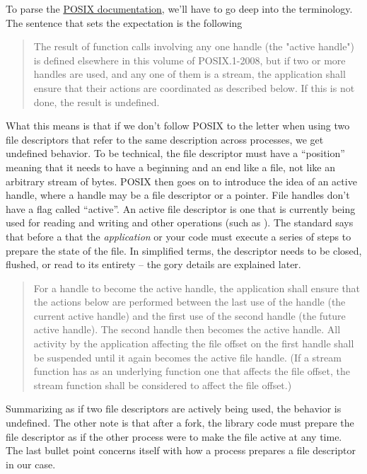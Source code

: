 To parse the \href{http://pubs.opengroup.org/onlinepubs/9699919799.2008edition/functions/V2_chap02.html}{POSIX documentation}, we'll have to go deep into the terminology.
The sentence that sets the expectation is the following

\begin{quote}
The result of function calls involving any one handle (the "active handle") is defined elsewhere in this volume of POSIX.1-2008, but if two or more handles are used, and any one of them is a stream, the application shall ensure that their actions are coordinated as described below. If this is not done, the result is undefined.
\end{quote}

What this means is that if we don't follow POSIX to the letter when using two file descriptors that refer to the same description across processes, we get undefined behavior.
To be technical, the file descriptor must have a ``position'' meaning that it needs to have a beginning and an end like a file, not like an arbitrary stream of bytes.
POSIX then goes on to introduce the idea of an active handle, where a handle may be a file descriptor or a  pointer.
File handles don't have a flag called ``active''.
An active file descriptor is one that is currently being used for reading and writing and other operations (such as ).
The standard says that before a  that the \textit{application} or your code must execute a series of steps to prepare the state of the file.
In simplified terms, the descriptor needs to be closed, flushed, or read to its entirety -- the gory details are explained later.

\begin{quote}
For a handle to become the active handle, the application shall ensure that the actions below are performed between the last use of the handle (the current active handle) and the first use of the second handle (the future active handle). The second handle then becomes the active handle. All activity by the application affecting the file offset on the first handle shall be suspended until it again becomes the active file handle. (If a stream function has as an underlying function one that affects the file offset, the stream function shall be considered to affect the file offset.)
\end{quote}

Summarizing as if two file descriptors are actively being used, the behavior is undefined.
The other note is that after a fork, the library code must prepare the file descriptor as if the other process were to make the file active at any time.
The last bullet point concerns itself with how a process prepares a file descriptor in our case.

